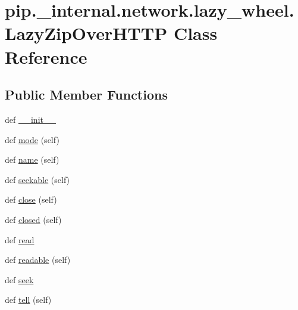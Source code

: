 \hypertarget{classpip_1_1__internal_1_1network_1_1lazy__wheel_1_1LazyZipOverHTTP}{}\section{pip.\+\_\+internal.\+network.\+lazy\+\_\+wheel.\+Lazy\+Zip\+Over\+H\+T\+TP Class Reference}
\label{classpip_1_1__internal_1_1network_1_1lazy__wheel_1_1LazyZipOverHTTP}
\subsection*{Public Member Functions}
\begin{DoxyCompactItemize}
\item 
def \hyperlink{classpip_1_1__internal_1_1network_1_1lazy__wheel_1_1LazyZipOverHTTP_a39689fe1c9c650996d06aac6ce5d4dba}{\+\_\+\+\_\+init\+\_\+\+\_\+}
\item 
def \hyperlink{classpip_1_1__internal_1_1network_1_1lazy__wheel_1_1LazyZipOverHTTP_a154eeb7d48f999e0588ffcdda39ff54c}{mode} (self)
\item 
def \hyperlink{classpip_1_1__internal_1_1network_1_1lazy__wheel_1_1LazyZipOverHTTP_a31eea23b50360a3d64d5330d6314d390}{name} (self)
\item 
def \hyperlink{classpip_1_1__internal_1_1network_1_1lazy__wheel_1_1LazyZipOverHTTP_a1c29ae1ccc009bcbd35bf389523c4c9e}{seekable} (self)
\item 
def \hyperlink{classpip_1_1__internal_1_1network_1_1lazy__wheel_1_1LazyZipOverHTTP_a6fa004fecbd8451f6abe9977b21afcd8}{close} (self)
\item 
def \hyperlink{classpip_1_1__internal_1_1network_1_1lazy__wheel_1_1LazyZipOverHTTP_a79c552bfacdf6de6826b58ae6b555720}{closed} (self)
\item 
def \hyperlink{classpip_1_1__internal_1_1network_1_1lazy__wheel_1_1LazyZipOverHTTP_a89d93d300402b023d608abd2bdd6bd06}{read}
\item 
def \hyperlink{classpip_1_1__internal_1_1network_1_1lazy__wheel_1_1LazyZipOverHTTP_a4bf18e97f3a3fa521f844803785c4c91}{readable} (self)
\item 
def \hyperlink{classpip_1_1__internal_1_1network_1_1lazy__wheel_1_1LazyZipOverHTTP_a422b73edeb33abc599f7567925a21b1d}{seek}
\item 
def \hyperlink{classpip_1_1__internal_1_1network_1_1lazy__wheel_1_1LazyZipOverHTTP_af9b9d696f45b39cc4453282f80d1e825}{tell} (self)

\end{DoxyCompactItemize}
